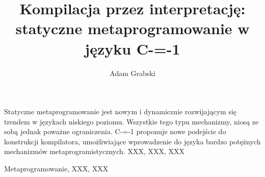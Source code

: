 \documentclass[
    left=2.5cm,         %
    right=2.5cm,        %
    top=2.5cm,          %
    bottom=3cm,         %
    bindingoffset=6mm,  %
    nohyphenation=false %
]{eiti/eiti-thesis}
\begin{document}
\MasterThesis %
{}
\title{
Kompilacja przez interpretację:\\
statyczne metaprogramowanie w języku C-=-1
}
\author{Adam Grabski}
\date{\the\year}
\maketitle

\cleardoublepage %
\streszczenie 
Statyczne metaprogramowanie jest nowym i dynamicznie rozwijającym się trendem w językach niskiego poziomu.
Wszystkie tego typu mechanizmy, niosą ze sobą jednak poważne ograniczenia.
C-=-1 proponuje nowe podejście do konstrukcji kompilatora, umożliwiające wprowadzenie do języka bardzo potężnych mechanizmów metaprogramistycznych. 
\slowakluczowe XXX, XXX, XXX

\newpage
\abstract \kant[1-3]
\keywords Metaprogramowanie, XXX, XXX

\cleardoublepage  %
\pagestyle{plain}
\makeauthorship

\cleardoublepage %
\tableofcontents

\cleardoublepage %
\pagestyle{headings}





\end{document}
